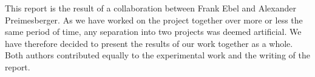 \begin{declaration}
	
	This report is the result of a collaboration between Frank Ebel and Alexander Preimesberger. As we have worked on the project together over more or less the same period of time, any separation into two projects was deemed artificial. We have therefore decided to present the results of our work together as a whole. Both authors contributed equally to the experimental work and the writing of the report.
	
\end{declaration}